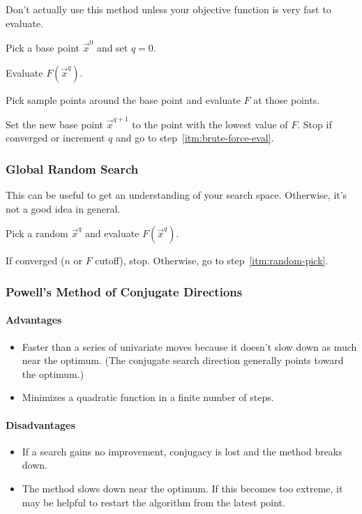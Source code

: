 \documentclass{article}
\begin{document}
Don't actually use this method unless your objective function is very fast to evaluate.

\begin{enumerate*}
\item Pick a base point \(\vec{x}^0\) and set \(q = 0\).
\item \label{itm:brute-force-eval} Evaluate \(F(\vec{x}^q)\).
\item Pick sample points around the base point and evaluate \(F\) at those points.
\item Set the new base point \(\vec{x}^{q+1}\) to the point with the lowest value of \(F\). Stop if
  converged or increment \(q\) and go to step~\ref{itm:brute-force-eval}.
\end{enumerate*}

\subsubsection{Global Random Search}

This can be useful to get an understanding of your search space. Otherwise, it's not a good idea in
general.

\begin{enumerate*}
\item \label{itm:random-pick} Pick a random \(\vec{x}^q\) and evaluate \(F(\vec{x}^q)\).
\item If converged (\(n\) or \(F\) cutoff), stop. Otherwise, go to step~\ref{itm:random-pick}.
\end{enumerate*}

\subsubsection{Powell's Method of Conjugate Directions}

\paragraph{Advantages}
\begin{itemize}
\item Faster than a series of univariate moves because it doesn't slow down as much near the
  optimum. (The conjugate search direction generally points toward the optimum.)
\item Minimizes a quadratic function in a finite number of steps.
\end{itemize}

\paragraph{Disadvantages}
\begin{itemize}
\item If a search gains no improvement, conjugacy is lost and the method breaks down.
\item The method slows down near the optimum. If this becomes too extreme, it may be helpful to
  restart the algorithm from the latest point.
\end{itemize}
\end{document}
